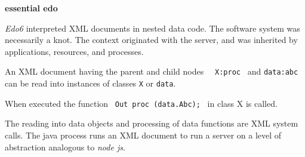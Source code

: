 

\bf {essential edo}

\rm {\it Edo6} interpreted XML documents in nested data code.  The
software system was necessarily a knot.  The context originated with
the server, and was inherited by applications, resources, and
processes.  

\rm An XML document having the parent and child nodes \ {\tt
X:proc} \ and {\tt data:abc} can be read into instances of classes
{\tt X} or {\tt data}.

\rm When executed the function \ {\tt Out proc (data.Abc);} \ in
class X is called.

\rm The reading into data objects and processing of data functions are XML
system calls.  The java process runs an XML document to run a server
on a level of abstraction analogous to {\it node js}.


\bye
